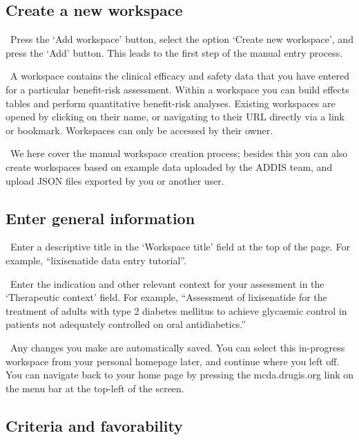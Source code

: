 \documentclass[00_mcda_tutorial.tex]{subfiles}
\begin{document}
\subsection*{Create a new workspace}
\leftpointright \, Press the ‘Add workspace’ button, select the option ‘Create new workspace’, and press the ‘Add’ button. This leads to the first step of the manual entry process.
\newline

\noindent \faGraduationCap \, A workspace contains the clinical efficacy and safety data that you have entered for a particular benefit-risk assessment. Within a workspace you can build effects tables and perform quantitative benefit-risk analyses. Existing workspaces are opened by clicking on their name, or navigating to their URL directly via a link or bookmark. Workspaces can only be accessed by their owner.
\newline

\noindent \faLightbulbO \, We here cover the manual workspace creation process; besides this you can also create workspaces based on example data uploaded by the ADDIS team, and upload JSON files exported by you or another user.

\subsection*{Enter general information}
\noindent \leftpointright \, Enter a descriptive title in the ‘Workspace title’ field at the top of the page. For example, “lixisenatide data entry tutorial”.
\newline

\noindent \leftpointright \, Enter the indication and other relevant context for your assessment in the ‘Therapeutic context’ field. For example, “Assessment of lixisenatide for the treatment of adults with type 2 diabetes mellitus to achieve glycaemic control in patients not adequately controlled on oral antidiabetics.”
\newline

\noindent \faLightbulbO \, Any changes you make are automatically saved. You can select this in-progress workspace from your personal homepage later, and continue where you left off. You can navigate back to your home page by pressing the mcda.drugis.org link on the menu bar at the top-left of the screen.

\subsection*{Criteria and favorability}
\end{document}
